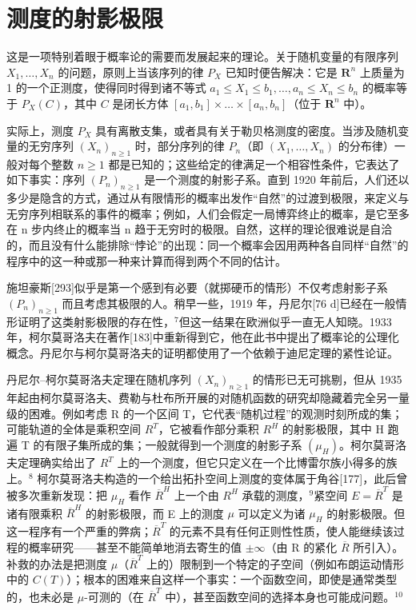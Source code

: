 \section*{测度的射影极限}
{}

这是一项特别着眼于概率论的需要而发展起来的理论。关于随机变量的有限序列 \(X_{1}, \ldots, X_{n}\) 的问题，原则上当该序列的律 \(P_{X}\) 已知时便告解决：它是 \(\mathbf{R}^{n}\) 上质量为 1 的一个正测度，使得同时得到诸不等式 \(a_{1} \leq X_{1} \leq b_{1}, \ldots, a_{n} \leq X_{n} \leq b_{n}\) 的概率等于 \(P_{X}(C)\)，其中 \(C\) 是闭长方体 \([a_{1}, b_{1}] \times \ldots \times [a_{n}, b_{n}]\)（位于 \(\mathbf{R}^{n}\) 中）。

实际上，测度 \(P_{X}\) 具有离散支集，或者具有关于勒贝格测度的密度。当涉及随机变量的无穷序列 \((X_{n})_{n\geq1}\) 时，部分序列的律 \(P_{n}\)（即 \((X_{1},\ldots,X_{n})\) 的分布律）一般对每个整数 \(n\geq1\) 都是已知的；这些给定的律满足一个相容性条件，它表达了如下事实：序列 \((P_{n})_{n\geq1}\) 是一个测度的射影子系。直到 1920 年前后，人们还以多少是隐含的方式，通过从有限情形的概率出发作“自然”的过渡到极限，来定义与无穷序列相联系的事件的概率；例如，人们会假定一局博弈终止的概率，是它至多在 n 步内终止的概率当 n 趋于无穷时的极限。自然，这样的理论很难说是自洽的，而且没有什么能排除“悖论”的出现：同一个概率会因用两种各自同样“自然”的程序中的这一种或那一种来计算而得到两个不同的估计。

施坦豪斯{[}293{]}似乎是第一个感到有必要（就掷硬币的情形）不仅考虑射影子系 \((P_{n})_{n\geq1}\) 而且考虑其极限的人。稍早一些，1919 年，丹尼尔{[}76 d{]}已经在一般情形证明了这类射影极限的存在性，\(^{7}\)但这一结果在欧洲似乎一直无人知晓。1933 年，柯尔莫哥洛夫在著作{[}183{]}中重新得到它，他在此书中提出了概率论的公理化概念。丹尼尔与柯尔莫哥洛夫的证明都使用了一个依赖于迪尼定理的紧性论证。

丹尼尔–柯尔莫哥洛夫定理在随机序列 \((X_{n})_{n\geq1}\) 的情形已无可挑剔，但从 1935 年起由柯尔莫哥洛夫、费勒与杜布所开展的对随机函数的研究却隐藏着完全另一量级的困难。例如考虑 R 的一个区间 T，它代表“随机过程”的观测时刻所成的集；可能轨道的全体是乘积空间 \(R^{T}\)，它被看作部分乘积 \(R^{H}\) 的射影极限，其中 H 跑遍 T 的有限子集所成的集；一般就得到一个测度的射影子系 \((\mu_{H})\)。柯尔莫哥洛夫定理确实给出了 \(R^{T}\) 上的一个测度，但它只定义在一个比博雷尔族小得多的族上。\(^{8}\) 柯尔莫哥洛夫构造的一个给出拓扑空间上测度的变体属于角谷{[}177{]}，此后曾被多次重新发现：把 \(\mu_{H}\) 看作 \(\overline{R}^{H}\) 上一个由 \(R^{H}\) 承载的测度，\(^{9}\)紧空间 \(E=\overline{R}^{T}\) 是诸有限乘积 \(\overline{R}^{H}\) 的射影极限，而 E 上的测度 \(\mu\) 可以定义为诸 \(\mu_{H}\) 的射影极限。但这一程序有一个严重的弊病；\(\overline{R}^{T}\) 的元素不具有任何正则性性质，使人能继续该过程的概率研究——甚至不能简单地消去寄生的值 \(\pm\infty\)（由 R 的紧化 \(\overline{R}\) 所引入）。补救的办法是把测度 \(\mu\)（\(\overline{R}^{T}\) 上的）限制到一个特定的子空间（例如布朗运动情形中的 \(C(T)\)）；根本的困难来自这样一个事实：一个函数空间，即使是通常类型的，也未必是 \(\mu\)-可测的（在 \(\overline{R}^{T}\) 中），甚至函数空间的选择本身也可能成问题。\(^{10}\)

